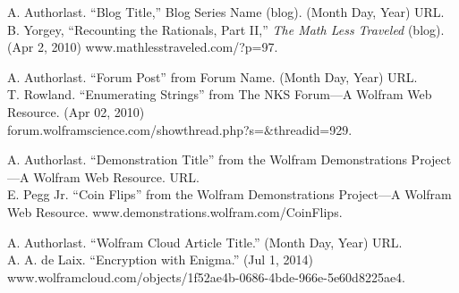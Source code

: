 \documentclass{article}
\begin{document}
\begin{thebibliography}{99}
A. Authorlast. ``Blog Title,'' Blog Series Name (blog). (Month Day, Year) URL.\\
B. Yorgey, ``Recounting the Rationals, Part II,'' \textit{The Math
Less Traveled} (blog). (Apr 2, 2010) www.mathlesstraveled.com/?p=97.

A. Authorlast. ``Forum Post'' from Forum Name. (Month Day, Year) URL.\\
T. Rowland. ``Enumerating Strings'' from The NKS Forum---A
Wolfram Web Resource. (Apr 02, 2010)\\
forum.wolframscience.com/showthread.php?s=$\&$threadid=929.

A. Authorlast. ``Demonstration Title'' from the Wolfram Demonstrations
Project---A Wolfram Web Resource. URL.\\
E. Pegg Jr. ``Coin Flips'' from the Wolfram Demonstrations Project---A
Wolfram Web Resource. www.demonstrations.wolfram.com/CoinFlips.

A. Authorlast. ``Wolfram Cloud Article Title.'' (Month Day, Year) URL.\\
A. A. de Laix. ``Encryption with Enigma.'' (Jul 1, 2014) www.wolframcloud.com/objects/1f52ae4b-0686-4bde-966e-5e60d8225ae4.

\end{thebibliography}
\end{document}
